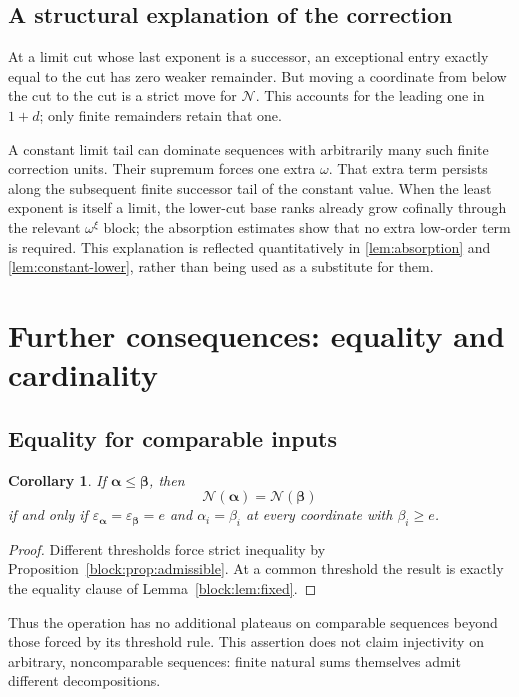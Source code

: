 \documentclass[11pt,a4paper]{article}
\newtheorem{corollary}[theorem]{Corollary}
\theoremstyle{definition}
\newcommand{\OpN}{\mathcal N}
\newcommand{\seq}[1]{\boldsymbol{#1}}
\newcommand{\epsa}{\varepsilon_{\seq\alpha}}
\newcommand{\epsb}{\varepsilon_{\seq\beta}}
\begin{document}
\subsection{A structural explanation of the correction}
At a limit cut whose last exponent is a successor, an exceptional entry
exactly equal to the cut has zero weaker remainder. But moving a coordinate
from below the cut to the cut is a strict move for $\OpN$. This accounts for
the leading one in $1+d$; only finite remainders retain that one.

A constant limit tail can dominate sequences with arbitrarily many such
finite correction units. Their supremum forces one extra $\omega$. That
extra term persists along the subsequent finite successor tail of the
constant value. When the least exponent is itself a limit, the lower-cut
base ranks already grow cofinally through the relevant $\omega^\xi$ block;
the absorption estimates show that no extra low-order term is required.
This explanation is reflected quantitatively in \cref{lem:absorption} and
\cref{lem:constant-lower}, rather than being used as a substitute for them.

\section{Further consequences: equality and cardinality}\label{block:sec:consequences}

\subsection{Equality for comparable inputs}

\begin{corollary}\label{block:cor:equality}
If $\seq\alpha\le\seq\beta$, then
\[
 \OpN(\seq\alpha)=\OpN(\seq\beta)
\]
if and only if $\epsa=\epsb=e$ and $\alpha_i=\beta_i$ at every coordinate with $\beta_i\ge e$.
\end{corollary}
\begin{proof}
Different thresholds force strict inequality by Proposition~\ref{block:prop:admissible}. At a common threshold the result is exactly the equality clause of Lemma~\ref{block:lem:fixed}.
\end{proof}

Thus the operation has no additional plateaus on comparable sequences beyond those forced by its threshold rule. This assertion does not claim injectivity on arbitrary, noncomparable sequences: finite natural sums themselves admit different decompositions.
\end{document}
